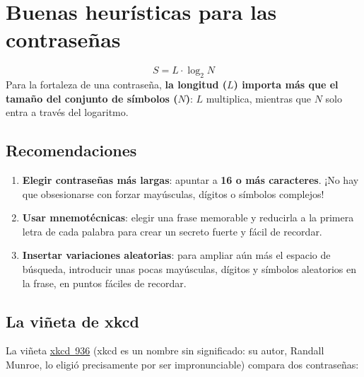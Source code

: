 \documentclass[11pt,a4paper]{report}
\begin{document}
\section{Buenas heurísticas para las contraseñas}
 
\begin{importante}[title={La fórmula de la entropía}]
\[ S = L \cdot \log_2 N \]
Para la fortaleza de una contraseña, \textbf{la longitud ($L$) importa más que el tamaño del conjunto de símbolos ($N$)}: $L$ multiplica, mientras que $N$ solo entra a través del logaritmo.
\end{importante}
 
\subsection*{Recomendaciones}
\begin{enumerate}
  \item \textbf{Elegir contraseñas más largas}: apuntar a \textbf{16 o más caracteres}. ¡No hay que obsesionarse con forzar mayúsculas, dígitos o símbolos complejos!
  \item \textbf{Usar mnemotécnicas}: elegir una frase memorable y reducirla a la primera letra de cada palabra para crear un secreto fuerte y fácil de recordar.
  \item \textbf{Insertar variaciones aleatorias}: para ampliar aún más el espacio de búsqueda, introducir unas pocas mayúsculas, dígitos y símbolos aleatorios en la frase, en puntos fáciles de recordar.
\end{enumerate}
 
\subsection{La viñeta de xkcd}
 
La viñeta \href{https://www.xkcd.com/936/}{xkcd~936} (xkcd es un nombre sin significado: su autor, Randall Munroe, lo eligió precisamente por ser impronunciable) compara dos contraseñas:
 
\end{document}
